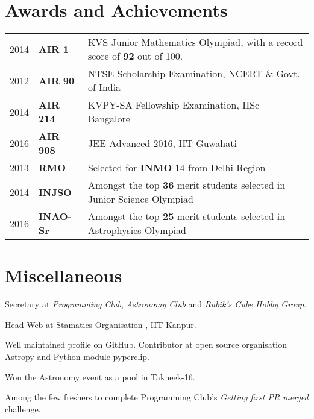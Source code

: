 \documentclass[]{deedy-resume-openfont}
\begin{document}
\begin{minipage}[t]{0.66\textwidth}
\section{Awards and Achievements} 
\begin{tabular}{rll}
  2014	   & \textbf{AIR 1}  & KVS Junior Mathematics Olympiad, with a record score of \textbf{92} out of 100. \\
  2012	   & \textbf{AIR 90} & NTSE Scholarship Examination, NCERT \& Govt. of India \\
  2014	   & \textbf{AIR 214}& KVPY-SA Fellowship Examination, IISc Bangalore \\
  2016     & \textbf{AIR 908}& JEE Advanced 2016, IIT-Guwahati \\
  2013	    & \textbf{RMO}     & Selected for \textbf{INMO}-14 from Delhi Region \\
  2014	    & \textbf{INJSO}   & Amongst the top \textbf{36} merit students selected in Junior Science Olympiad   \\
  2016      & \textbf{INAO-Sr} & Amongst the top \textbf{25} merit students selected in Astrophysics Olympiad  \\
\end{tabular}

\vspace{1 cm}

\section{Miscellaneous}
\vspace{\topsep}
\begin{tightemize}
\item Secretary at \emph{Programming Club}, \emph{Astronomy Club} and \emph{Rubik's Cube Hobby Group}.
\item Head-Web at Stamatics Organisation , IIT Kanpur.
\item Well maintained profile on GitHub. Contributor at open source organisation Astropy and Python module pyperclip.
\item Won the Astronomy event as a pool in Takneek-16.
\item Among the few freshers to complete Programming Club's \textit{Getting first PR merged} challenge. 
\end{tightemize}
\end{minipage} 
\end{document}
